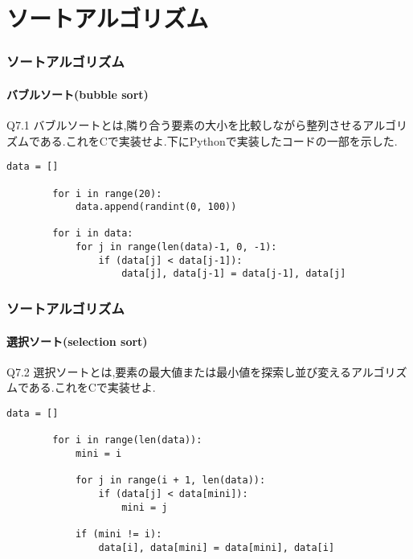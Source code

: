 \documentclass[dvipdfmx]{beamer}
\begin{document}
\section{ソートアルゴリズム}
\begin{frame}[t, fragile]
    \frametitle{ソートアルゴリズム}
    \framesubtitle{バブルソート(bubble sort)}
    \begin{itembox}[l]{Q7.1}
        バブルソートとは,隣り合う要素の大小を比較しながら整列させるアルゴリズムである.これをCで実装せよ.下にPythonで実装したコードの一部を示した.
    \end{itembox}
    \begin{lstlisting}[gobble=8, caption=bubbleSort.py, label=bubbleSort]
        data = []

        for i in range(20):
            data.append(randint(0, 100))

        for i in data:
            for j in range(len(data)-1, 0, -1):
                if (data[j] < data[j-1]):
                    data[j], data[j-1] = data[j-1], data[j]
    \end{lstlisting}
\end{frame}

\begin{frame}[t, fragile]
    \frametitle{ソートアルゴリズム}
    \framesubtitle{選択ソート(selection sort)}
    \begin{itembox}[l]{Q7.2}
        選択ソートとは,要素の最大値または最小値を探索し並び変えるアルゴリズムである.これをCで実装せよ.
    \end{itembox}
    \begin{lstlisting}[gobble=8, caption=selectionSort.py, label=selectionSort]
        data = []

        for i in range(len(data)):
            mini = i

            for j in range(i + 1, len(data)):
                if (data[j] < data[mini]):
                    mini = j

            if (mini != i):
                data[i], data[mini] = data[mini], data[i]
    \end{lstlisting}
\end{frame}
\end{document}
